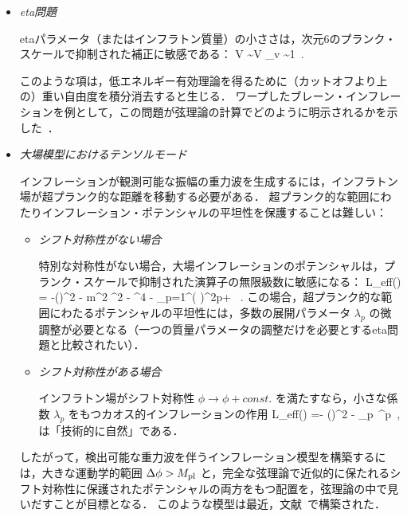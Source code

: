\begin{itemize}
\item {\it eta問題}

etaパラメータ（またはインフラトン質量）の小ささは，次元6のプランク・スケールで抑制された補正に敏感である：
\beq
\Delta V \sim V  \qquad \Rightarrow \qquad \Delta \eta_{\rm v} \sim 1\, . \nonumber
\eeq

このような項は，低エネルギー有効理論を得るために（カットオフより上の）重い自由度を積分消去すると生じる．
ワープしたブレーン・インフレーションを例として，この問題が弦理論の計算でどのように明示されるかを示した~\cite{Baumann:2006th, Baumann:2007ah, Baumann:2008kq, BaumannProgress}．

\item {\it 大場模型におけるテンソルモード}

インフレーションが観測可能な振幅の重力波を生成するには，インフラトン場が超プランク的な距離を移動する必要がある．
超プランク的な範囲にわたりインフレーション・ポテンシャルの平坦性を保護することは難しい：
\begin{itemize}
\item {\it シフト対称性がない場合}

特別な対称性がない場合，大場インフレーションのポテンシャルは，プランク・スケールで抑制された演算子の無限級数に敏感になる：
\beq
{\cal L}_{\rm eff}(\phi) = -(\partial \phi)^2 -  m^2 \phi^2 -  \lambda \phi^4 - \sum_{p=1}^\infty {} \left(  \right)^{2p}+ \cdots \ . \nonumber
\eeq
この場合，超プランク的な範囲にわたるポテンシャルの平坦性には，多数の展開パラメータ $\lambda_p$ の微調整が必要となる（一つの質量パラメータの調整だけを必要とするeta問題と比較されたい）．

\item {\it シフト対称性がある場合}

インフラトン場がシフト対称性 $\phi \to \phi + const.$ を満たすなら，小さな係数 $\lambda_p$ をもつカオス的インフレーションの作用
 \beq
 {\cal L}_{\rm eff}(\phi) =-  (\partial \phi)^2 - \lambda_p\, \phi^p\, , \nonumber
 \eeq
は「技術的に自然」である．
\end{itemize}
したがって，検出可能な重力波を伴うインフレーション模型を構築するには，大きな運動学的範囲 $\Delta \phi > M_{\rm pl}$ と，完全な弦理論で近似的に保たれるシフト対称性に保護されたポテンシャルの両方をもつ配置を，弦理論の中で見いだすことが目標となる．
このような模型は最近，文献~\cite{Silverstein:2008sg, MSW, Flauger:2009ab}で構築された．
\end{itemize}




